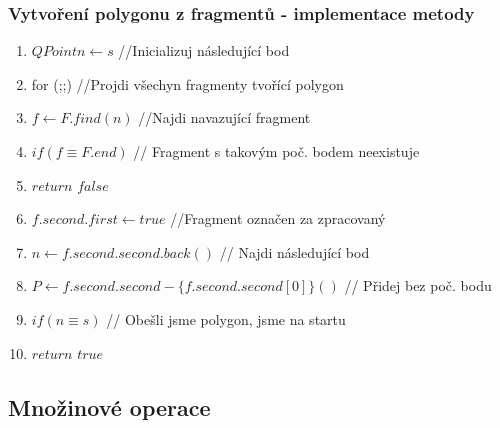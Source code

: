 \documentclass[a4paper, 12pt]{article}
\begin{document}
\vspace{1.5cm}
\subsubsection{Vytvoření polygonu z fragmentů  - implementace metody}

\begin{enumerate}
	\item  $ QPoint n \longleftarrow s $ //Inicializuj následující bod
	\item for (;;) //Projdi všechyn fragmenty tvořící polygon
	\item \hspace{1cm} $ f \longleftarrow F.find(n) $ //Najdi navazující fragment
	\item \hspace{1cm} $ if (f \equiv F.end) $ // Fragment s takovým poč. bodem neexistuje
	\item \hspace{2cm} $ return$ $ false $
	\item \hspace{1cm} $ f.second.first \longleftarrow true $ //Fragment označen za zpracovaný
	\item \hspace{1cm} $ n \longleftarrow f.second.second.back() $ // Najdi následující bod
	\item \hspace{1cm} $ P \longleftarrow f.second.second - \{f.second.second[0]\}() $ // Přidej bez poč. bodu
	\item \hspace{1cm} $ if (n \equiv s) $ // Obešli jsme polygon, jsme na startu
	\item \hspace{2cm} $ return$  $true $
\end{enumerate}

\clearpage

\subsection{Množinové operace}
\end{document}
